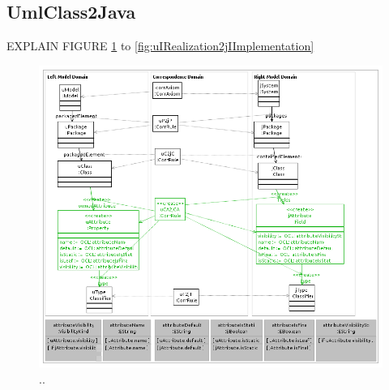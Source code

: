 \documentclass[tuberlin,cic,tc,english,noabntcite]{iiufrgs}
\begin{document}

\subsection{UmlClass2Java}
EXPLAIN FIGURE \ref{fig:uCAttribute2jCAttribute} to \ref{fig:uIRealization2jIImplementation}

\begin{figure}[h]
    \caption{..}
    \begin{center}
        \includegraphics[width=40em]{uCAttribute2jCAttribute}
    \end{center}
    \label{fig:uCAttribute2jCAttribute}
\end{figure}
\end{document}

